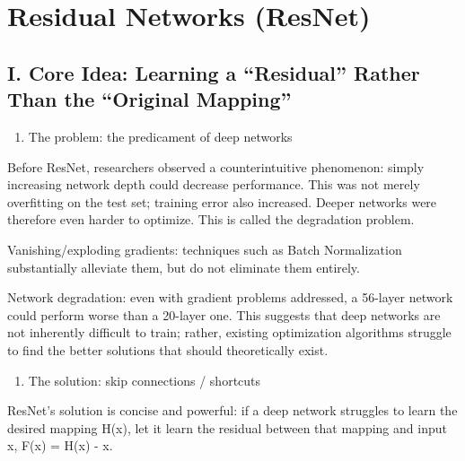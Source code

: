 \setcounter{section}{3}

\hypertarget{residual-networks-resnet}{%
\section{Residual Networks (ResNet)}\label{residual-networks-resnet}}

\hypertarget{i.-core-idea-learning-a-residual-rather-than-the-original-mapping}{%
\subsection{I. Core Idea: Learning a ``Residual'' Rather Than the ``Original Mapping''}\label{i.-core-idea-learning-a-residual-rather-than-the-original-mapping}}

\begin{enumerate}
\def\labelenumi{\arabic{enumi}.}
\tightlist
\item
  The problem: the predicament of deep networks
\end{enumerate}

Before ResNet, researchers observed a counterintuitive phenomenon: simply increasing network depth could decrease performance. This was not merely overfitting on the test set; training error also increased. Deeper networks were therefore even harder to optimize. This is called the degradation problem.

Vanishing/exploding gradients: techniques such as Batch Normalization substantially alleviate them, but do not eliminate them entirely.

Network degradation: even with gradient problems addressed, a 56-layer network could perform worse than a 20-layer one. This suggests that deep networks are not inherently difficult to train; rather, existing optimization algorithms struggle to find the better solutions that should theoretically exist.

\begin{enumerate}
\def\labelenumi{\arabic{enumi}.}
\setcounter{enumi}{1}
\tightlist
\item
  The solution: skip connections / shortcuts
\end{enumerate}

ResNet's solution is concise and powerful: if a deep network struggles to learn the desired mapping H(x), let it learn the residual between that mapping and input x, F(x) = H(x) - x.

